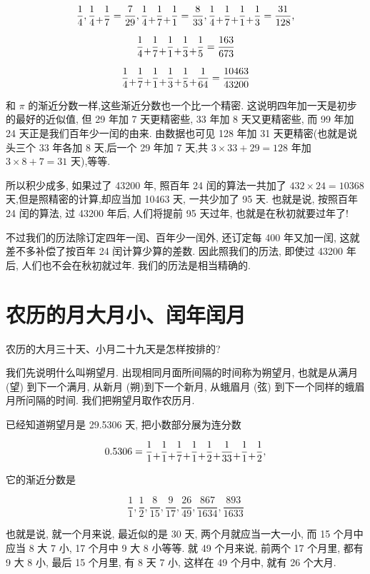 \documentclass{ctexart}
\newcommand{\cplus}{\raisebox{-1ex}{+}}
\begin{document}
\[
\frac{1}{4},\frac{1}{4} \cplus \frac{1}{7} = \frac{7}{29},\frac{1}{4} \cplus \frac{1}{7} \cplus \frac{1}{1} = \frac{8}{33},\frac{1}{4} \cplus \frac{1}{7} \cplus \frac{1}{1} \cplus \frac{1}{3} = \frac{31}{128}\text{,}
\]

\[
\frac{1}{4} \cplus \frac{1}{7} \cplus \frac{1}{1} \cplus \frac{1}{3} \cplus \frac{1}{5} = \frac{163}{673}
\]

\[
\frac{1}{4} \cplus \frac{1}{7} \cplus \frac{1}{1} \cplus \frac{1}{3} \cplus \frac{1}{5} \cplus \frac{1}{64} = \frac{10463}{43200}
\]

和 \(\pi\) 的渐近分数一样,这些渐近分数也一个比一个精密. 这说明四年加一天是初步的最好的近似值, 但 29 年加 7 天更精密些, 33 年加 8 天又更精密些, 而 99 年加 24 天正是我们百年少一闰的由来. 由数据也可见 128 年加 31 天更精密(也就是说头三个 33 年各加 8 天,后一个 29 年加 7 天,共 \(3 \times {33} + {29} = 128 \)  年加 \(3 \times 8 + 7 = {31}\) 天),等等.

所以积少成多, 如果过了 43200 年, 照百年 24 闰的算法一共加了 \({432} \times {24} = {10368}\) 天,但是照精密的计算,却应当加 10463 天, 一共少加了 95 天. 也就是说, 按照百年 24 闰的算法, 过 43200 年后, 人们将提前 95 天过年, 也就是在秋初就要过年了!

不过我们的历法除订定四年一闰、百年少一闰外, 还订定每 400 年又加一闰, 这就差不多补偿了按百年 24 闰计算少算的差数. 因此照我们的历法, 即使过 43200 年后, 人们也不会在秋初就过年. 我们的历法是相当精确的.

\section{农历的月大月小、闰年闰月}

农历的大月三十天、小月二十九天是怎样按排的?

我们先说明什么叫朔望月. 出现相同月面所间隔的时间称为朔望月, 也就是从满月 (望) 到下一个满月, 从新月 (朔)到下一个新月, 从蛾眉月 (弦) 到下一个同样的蛾眉月所问隔的时间. 我们把朔望月取作农历月.

已经知道朔望月是 29.5306 天, 把小数部分展为连分数

\[
{0.5306} = \frac{1}{1} \cplus \frac{1}{1} \cplus \frac{1}{7} \cplus \frac{1}{1} \cplus \frac{1}{2} \cplus \frac{1}{33} \cplus \frac{1}{1}\cplus\frac{1}{2} ,
\]

它的渐近分数是

\[
\frac{1}{1},\frac{1}{2},\frac{8}{15},\frac{9}{17},\frac{26}{49},\frac{867}{1634},\frac{893}{1633}
\]

也就是说, 就一个月来说, 最近似的是 30 天, 两个月就应当一大一小, 而 15 个月中应当 8 大 7 小, 17 个月中 9 大 8 小等等. 就 49 个月来说, 前两个 17 个月里, 都有 9 大 8 小, 最后 15 个月里, 有 8 天 7 小, 这样在 49 个月中, 就有 26 个大月.
\end{document}
